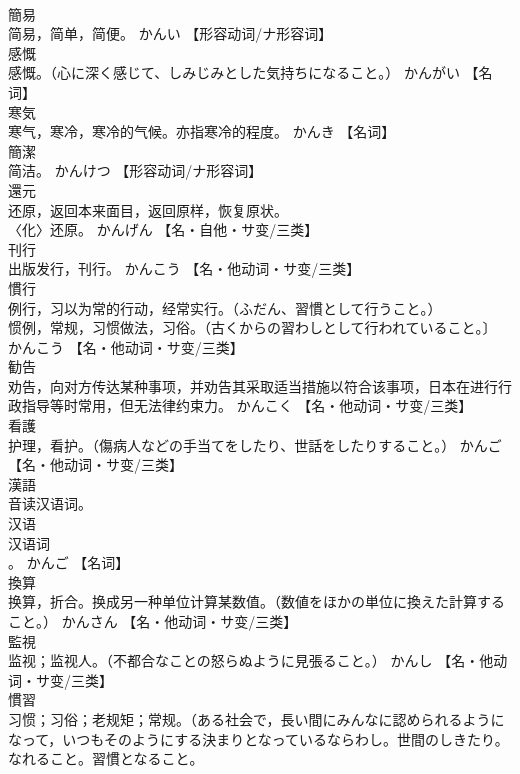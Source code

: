 \documentclass[8pt]{extreport}
\begin{document}
\begin{CJK}{UTF8}{min}
\\	簡易	
\\	简易，简单，简便。	かんい		【形容动词/ナ形容词】
\\	感慨	
\\	感慨。（心に深く感じて、しみじみとした気持ちになること。）	かんがい		【名词】
\\	寒気	
\\	寒气，寒冷，寒冷的气候。亦指寒冷的程度。	かんき		【名词】
\\	簡潔	
\\	简洁。	かんけつ		【形容动词/ナ形容词】
\\	還元	
\\	还原，返回本来面目，返回原样，恢复原状。 
\\	〈化〉还原。	かんげん		【名・自他・サ变/三类】
\\	刊行	
\\	出版发行，刊行。	かんこう		【名・他动词・サ变/三类】
\\	慣行	
\\	例行，习以为常的行动，经常实行。（ふだん、習慣として行うこと。） 
\\	惯例，常规，习惯做法，习俗。（古くからの習わしとして行われていること。〕	かんこう		【名・他动词・サ变/三类】
\\	勧告	
\\	劝告，向对方传达某种事项，并劝告其采取适当措施以符合该事项，日本在进行行政指导等时常用，但无法律约束力。	かんこく		【名・他动词・サ变/三类】
\\	看護	
\\	护理，看护。（傷病人などの手当てをしたり、世話をしたりすること。）	かんご		【名・他动词・サ变/三类】
\\	漢語	
\\	音读汉语词。 
\\	汉语
\\	汉语词
\\	。	かんご		【名词】
\\	換算	
\\	换算，折合。换成另一种单位计算某数值。（数値をほかの単位に換えた計算すること。）	かんさん		【名・他动词・サ变/三类】
\\	監視	
\\	监视；监视人。（不都合なことの怒らぬように見張ること。）	かんし		【名・他动词・サ变/三类】
\\	慣習	
\\	习惯；习俗；老规矩；常规。（ある社会で，長い間にみんなに認められるようになって，いつもそのようにする決まりとなっているならわし。世間のしきたり。なれること。習慣となること。 

\end{CJK}
\end{document}
